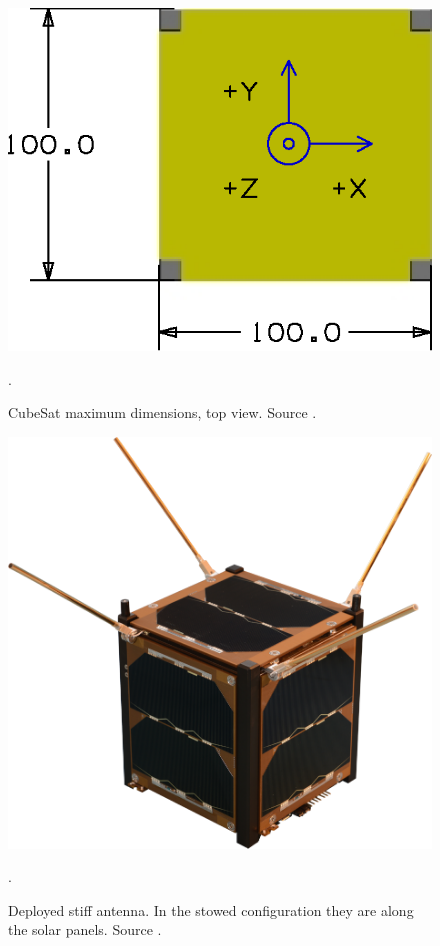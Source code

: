 \begin{figure}[H]
    \centering
    \includegraphics[width=0.45\paperwidth]{img/4/cubesat_dimensions.eps}
    \caption{CubeSat maximum dimensions, top view. Source \cite{cubesat_spec}.}.
    \label{CubeSat_max_dim}
\end{figure}

\begin{figure}[H]
    \centering
    \includegraphics[width=0.5\paperwidth]{img/4/antenna_stiff.png}
    \caption{Deployed stiff antenna. In the stowed configuration they are along the solar panels. Source \cite{stiff_antenna_paper}.}.
    \label{stiff_antenna_pic}
\end{figure}

